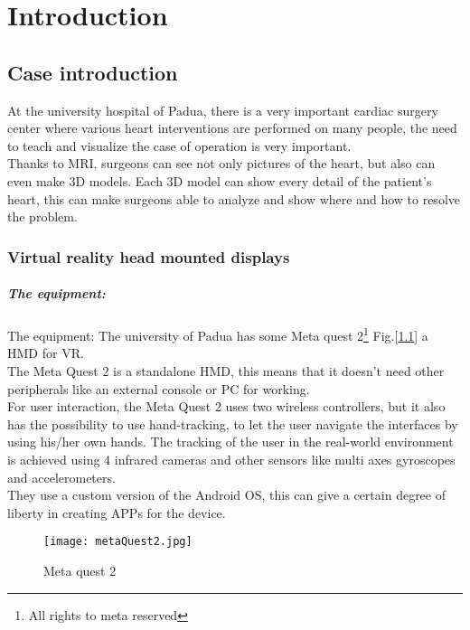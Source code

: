 
\chapter{Introduction}
\label{chp:intro}

\section{Case introduction}
\noindent
At the university hospital of Padua, 
there is a very important cardiac surgery center where various heart interventions are performed on many people,
the need to teach and visualize the case of operation is very important. \\
Thanks to MRI, surgeons can see not only pictures of the heart, but also can even make 3D models.
Each 3D model can show every detail of the patient's heart, this can make surgeons able to analyze and show where and how to resolve the problem.

\subsection{Virtual reality head mounted displays}

\paragraph{The equipment:}
The equipment: The university of Padua has some Meta quest 2\footnote{All rights to meta reserved} Fig.[\ref{fig:metaQuest2}] a \ac{HMD} for \ac{VR}.\\ 
The Meta Quest 2 is a standalone \ac{HMD}, this means that it doesn’t need other peripherals like an external console or \ac{PC} for working.\\
For user interaction, the Meta Quest 2 uses two wireless controllers, but it also has the possibility to use hand-tracking, to let the user navigate the interfaces by using his/her own hands.
The tracking of the user in the real-world environment is achieved using 4 infrared cameras and other sensors like multi axes gyroscopes and accelerometers.\\
They use a custom version of the Android \ac{OS}, this can give a certain degree of liberty in creating APPs for the device.

\begin{figure}[h]
  \centering
  \texttt{[image: metaQuest2.jpg]}
  \caption{Meta quest 2}
  \label{fig:metaQuest2}
\end{figure}

